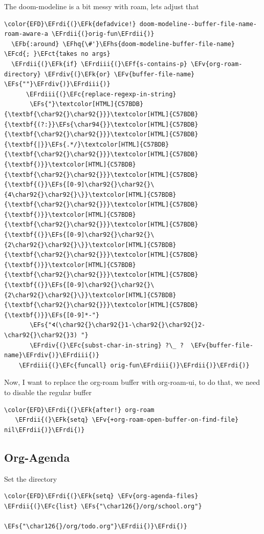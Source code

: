\documentclass{scrartcl}
\newcommand{\EFk}[1]{\textcolor{EFk}{#1}} %
\newcommand{\EFs}[1]{\textcolor{EFs}{#1}} %
\newcommand{\EFb}[1]{\textcolor{EFb}{#1}} %
\newcommand{\EFct}[1]{\textcolor{EFct}{#1}} %
\newcommand{\EFc}[1]{\textcolor{EFc}{#1}} %
\newcommand{\EFv}[1]{\textcolor{EFv}{#1}} %
\newcommand{\EFf}[1]{\textcolor{EFf}{#1}} %
\newcommand{\EFcd}[1]{\textcolor{EFcd}{#1}} %
\newcommand{\EFhq}[1]{#1} %
\newcommand{\EFhs}[1]{#1} %
\newcommand{\EFrdi}[1]{#1} %
\newcommand{\EFrdii}[1]{#1} %
\newcommand{\EFrdiii}[1]{#1} %
\newcommand{\EFrdiv}[1]{#1} %
\begin{document}
The doom-modeline is a bit messy with roam, lets adjust that
\begin{Code}
\begin{Verbatim}[]
\color{EFD}\EFrdi{(}\EFk{defadvice!} doom-modeline--buffer-file-name-roam-aware-a \EFrdii{(}orig-fun\EFrdii{)}
  \EFb{:around} \EFhq{\#'}\EFhs{doom-modeline-buffer-file-name} \EFcd{; }\EFct{takes no args}
  \EFrdii{(}\EFk{if} \EFrdiii{(}\EFf{s-contains-p} \EFv{org-roam-directory} \EFrdiv{(}\EFk{or} \EFv{buffer-file-name} \EFs{""}\EFrdiv{)}\EFrdiii{)}
      \EFrdiii{(}\EFc{replace-regexp-in-string}
       \EFs{"}\textcolor[HTML]{C57BDB}{\textbf{\char92{}\char92{}}}\textcolor[HTML]{C57BDB}{\textbf{(?:}}\EFs{\char94{}}\textcolor[HTML]{C57BDB}{\textbf{\char92{}\char92{}}}\textcolor[HTML]{C57BDB}{\textbf{|}}\EFs{.*/}\textcolor[HTML]{C57BDB}{\textbf{\char92{}\char92{}}}\textcolor[HTML]{C57BDB}{\textbf{)}}\textcolor[HTML]{C57BDB}{\textbf{\char92{}\char92{}}}\textcolor[HTML]{C57BDB}{\textbf{(}}\EFs{[0-9]\char92{}\char92{}\{4\char92{}\char92{}\}}\textcolor[HTML]{C57BDB}{\textbf{\char92{}\char92{}}}\textcolor[HTML]{C57BDB}{\textbf{)}}\textcolor[HTML]{C57BDB}{\textbf{\char92{}\char92{}}}\textcolor[HTML]{C57BDB}{\textbf{(}}\EFs{[0-9]\char92{}\char92{}\{2\char92{}\char92{}\}}\textcolor[HTML]{C57BDB}{\textbf{\char92{}\char92{}}}\textcolor[HTML]{C57BDB}{\textbf{)}}\textcolor[HTML]{C57BDB}{\textbf{\char92{}\char92{}}}\textcolor[HTML]{C57BDB}{\textbf{(}}\EFs{[0-9]\char92{}\char92{}\{2\char92{}\char92{}\}}\textcolor[HTML]{C57BDB}{\textbf{\char92{}\char92{}}}\textcolor[HTML]{C57BDB}{\textbf{)}}\EFs{[0-9]*-"}
       \EFs{"🢔(\char92{}\char92{}1-\char92{}\char92{}2-\char92{}\char92{}3) "}
       \EFrdiv{(}\EFc{subst-char-in-string} ?\_ ?  \EFv{buffer-file-name}\EFrdiv{)}\EFrdiii{)}
    \EFrdiii{(}\EFc{funcall} orig-fun\EFrdiii{)}\EFrdii{)}\EFrdi{)}
\end{Verbatim}
\end{Code}


Now, I want to replace the org-roam buffer with org-roam-ui, to do that, we need
to disable the regular buffer
\begin{Code}
\begin{Verbatim}[]
\color{EFD}\EFrdi{(}\EFk{after!} org-roam
   \EFrdii{(}\EFk{setq} \EFv{+org-roam-open-buffer-on-find-file} nil\EFrdii{)}\EFrdi{)}
\end{Verbatim}
\end{Code}

\subsection{Org-Agenda}
\label{sec:org7d28b86}
Set the directory
\begin{Code}
\begin{Verbatim}[]
\color{EFD}\EFrdi{(}\EFk{setq} \EFv{org-agenda-files} \EFrdii{(}\EFc{list} \EFs{"\char126{}/org/school.org"}
                             \EFs{"\char126{}/org/todo.org"}\EFrdii{)}\EFrdi{)}
\end{Verbatim}
\end{Code}
\end{document}
